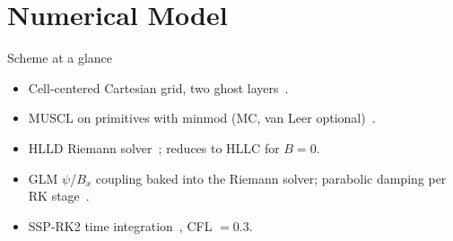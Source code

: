 \documentclass[aspectratio=43]{beamer}
\begin{document}
\section{Numerical Model}

%

\begin{frame}{Scheme at a glance}
  \begin{itemize}
    \item Cell-centered Cartesian grid, two ghost layers~\cite{versteeg2007,moukalled2016}.
    \item MUSCL on primitives with minmod (MC, van Leer optional)~\cite{toro2009}.
    \item HLLD Riemann solver~\cite{miyoshi2005}; reduces to HLLC for $B = 0$.
    \item GLM $\psi$/$B_x$ coupling baked into the Riemann solver; parabolic damping per RK stage~\cite{dedner2002}.
    \item SSP-RK2 time integration~\cite{shu1988}, CFL $= 0.3$.
  \end{itemize}
\end{frame}
\end{document}
